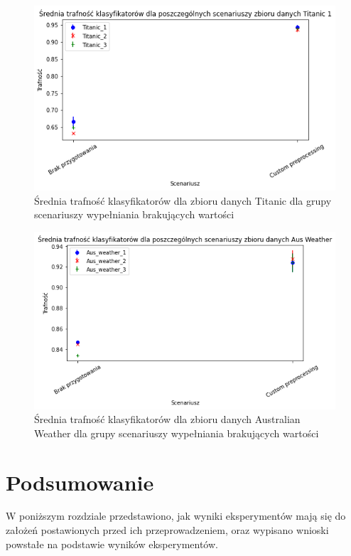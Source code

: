 \documentclass{book}
\begin{document}
\begin{figure}[H]
    \centerline{\includegraphics[scale=0.5]{Titanic_Avg_Custom}}
    \centering
    \caption{Średnia trafność klasyfikatorów dla zbioru danych Titanic 
    dla grupy scenariuszy wypełniania brakujących wartości}
    \end{figure}

\begin{figure}[H]
    \centerline{\includegraphics[scale=0.5]{Aus_Weather_Avg_Custom}}
    \centering
    \caption{Średnia trafność klasyfikatorów dla zbioru danych Australian Weather 
    dla grupy scenariuszy wypełniania brakujących wartości}
    \end{figure}


\chapter{Podsumowanie}

W poniższym rozdziale przedstawiono, jak wyniki eksperymentów mają się do założeń postawionych 
przed ich przeprowadzeniem, oraz wypisano wnioski powstałe na podstawie wyników eksperymentów.
\end{document}
